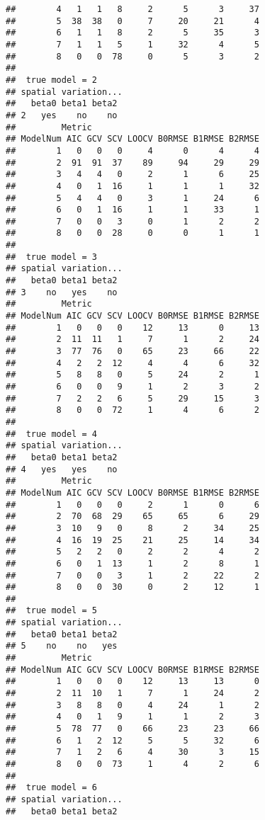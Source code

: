 \documentclass{article}\usepackage[]{graphicx}\usepackage[]{color}
\makeatletter
\newenvironment{kframe}{%
 \def\at@end@of@kframe{}%
 \ifinner\ifhmode%
  \def\at@end@of@kframe{\end{minipage}}%
  \begin{minipage}{\columnwidth}%
 \fi\fi%
 \def\FrameCommand##1{\hskip\@totalleftmargin \hskip-\fboxsep
 \colorbox{shadecolor}{##1}\hskip-\fboxsep
     \hskip-\linewidth \hskip-\@totalleftmargin \hskip\columnwidth}%
 \MakeFramed {\advance\hsize-\width
   \@totalleftmargin\z@ \linewidth\hsize
   \@setminipage}}%
 {\par\unskip\endMakeFramed%
 \at@end@of@kframe}
\newenvironment{knitrout}{}{} %
\makeatother
\begin{document}
\begin{knitrout}
\begin{kframe}
\begin{verbatim}
##        4   1   1   8     2      5      3     37
##        5  38  38   0     7     20     21      4
##        6   1   1   8     2      5     35      3
##        7   1   1   5     1     32      4      5
##        8   0   0  78     0      5      3      2
## 
##  true model = 2 
## spatial variation...
##   beta0 beta1 beta2
## 2   yes    no    no
##         Metric
## ModelNum AIC GCV SCV LOOCV B0RMSE B1RMSE B2RMSE
##        1   0   0   0     4      0      4      4
##        2  91  91  37    89     94     29     29
##        3   4   4   0     2      1      6     25
##        4   0   1  16     1      1      1     32
##        5   4   4   0     3      1     24      6
##        6   0   1  16     1      1     33      1
##        7   0   0   3     0      1      2      2
##        8   0   0  28     0      0      1      1
## 
##  true model = 3 
## spatial variation...
##   beta0 beta1 beta2
## 3    no   yes    no
##         Metric
## ModelNum AIC GCV SCV LOOCV B0RMSE B1RMSE B2RMSE
##        1   0   0   0    12     13      0     13
##        2  11  11   1     7      1      2     24
##        3  77  76   0    65     23     66     22
##        4   2   2  12     4      4      6     32
##        5   8   8   0     5     24      2      1
##        6   0   0   9     1      2      3      2
##        7   2   2   6     5     29     15      3
##        8   0   0  72     1      4      6      2
## 
##  true model = 4 
## spatial variation...
##   beta0 beta1 beta2
## 4   yes   yes    no
##         Metric
## ModelNum AIC GCV SCV LOOCV B0RMSE B1RMSE B2RMSE
##        1   0   0   0     2      1      0      6
##        2  70  68  29    65     65      6     29
##        3  10   9   0     8      2     34     25
##        4  16  19  25    21     25     14     34
##        5   2   2   0     2      2      4      2
##        6   0   1  13     1      2      8      1
##        7   0   0   3     1      2     22      2
##        8   0   0  30     0      2     12      1
## 
##  true model = 5 
## spatial variation...
##   beta0 beta1 beta2
## 5    no    no   yes
##         Metric
## ModelNum AIC GCV SCV LOOCV B0RMSE B1RMSE B2RMSE
##        1   0   0   0    12     13     13      0
##        2  11  10   1     7      1     24      2
##        3   8   8   0     4     24      1      2
##        4   0   1   9     1      1      2      3
##        5  78  77   0    66     23     23     66
##        6   1   2  12     5      5     32      6
##        7   1   2   6     4     30      3     15
##        8   0   0  73     1      4      2      6
## 
##  true model = 6 
## spatial variation...
##   beta0 beta1 beta2

\end{verbatim}
\end{kframe}
\end{knitrout}
\end{document}
